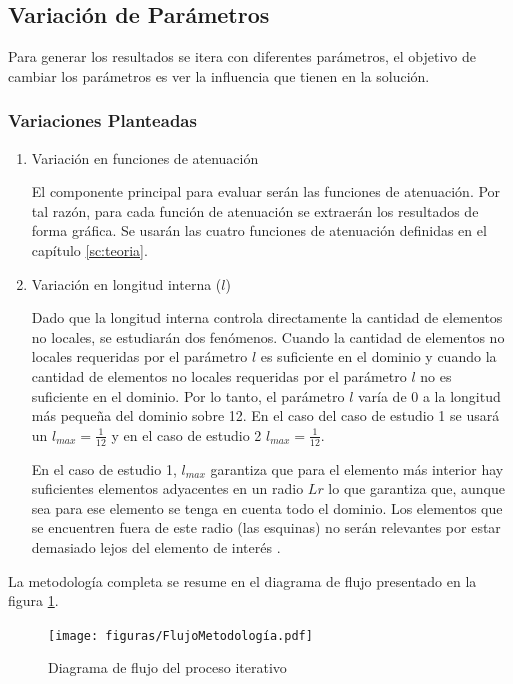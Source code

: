 	\subsection{Variación de Parámetros}
	\label{sub:variacion}
		Para generar los resultados se itera con diferentes parámetros, el objetivo de cambiar los parámetros es ver la influencia que tienen en la solución.
		\subsubsection{Variaciones Planteadas}
			\begin{enumerate}
				\item Variación en funciones de atenuación

				El componente principal para evaluar serán las funciones de atenuación. Por tal razón, para cada función de atenuación se extraerán los resultados de forma gráfica. Se usarán las cuatro funciones de atenuación definidas en el capítulo \ref{sc:teoria}.
				\item Variación en longitud interna ($l$)

				Dado que la longitud interna controla directamente la cantidad de elementos no locales, se estudiarán dos fenómenos. Cuando la cantidad de elementos no locales requeridas por el parámetro $l$ es suficiente en el dominio y cuando la cantidad de elementos no locales requeridas por el parámetro $l$ no es suficiente en el dominio. Por lo tanto, el parámetro $l$ varía de 0 a la longitud más pequeña del dominio sobre 12. En el caso del caso de estudio 1 se usará un $l_{max}=\frac{1}{12}$ y en el caso de estudio 2 $l_{max}=\frac{1}{12}$.

				En el caso de estudio 1, $l_{max}$ garantiza que para el elemento más interior hay suficientes elementos adyacentes en un radio $Lr$ lo que garantiza que, aunque sea para ese elemento se tenga en cuenta todo el dominio. Los elementos que se encuentren fuera de este radio (las esquinas) no serán relevantes por estar demasiado lejos del elemento de interés \parencite{Polizzotto2001}. 
			\end{enumerate}
	La metodología completa se resume en el diagrama de flujo presentado en la figura \ref{fig:flowchart}.

	\begin{figure}
		\centering
		\sffamily
		\texttt{[image: figuras/FlujoMetodología.pdf]}
		\caption{Diagrama de flujo del proceso iterativo}
		\label{fig:flowchart}
	\end{figure}